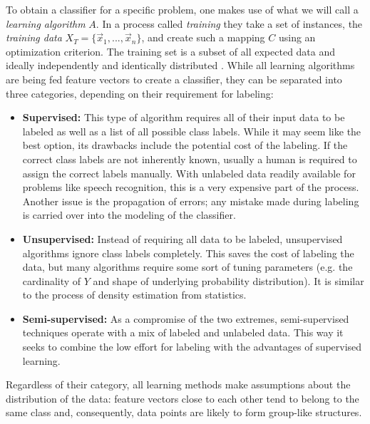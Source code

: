 To obtain a classifier for a specific problem, one makes use of what we will call a \textit{learning algorithm} $A$. In a process called \textit{training} they take a set of instances, the \textit{training data} $X_T = \{\vec{x}_1, ..., \vec{x}_n\}$, and create such a mapping $C$ using an optimization criterion. The training set is a subset of all expected data and ideally independently and identically distributed \cite{RodriguezEtAl2013}. While all learning algorithms are being fed feature vectors to create a classifier, they can be separated into three categories, depending on their requirement for labeling:
\begin{itemize}
\item \textbf{Supervised:}
This type of algorithm requires all of their input data to be labeled as well as a list of all possible class labels. While it may seem like the best option, its drawbacks include the potential cost of the labeling. If the correct class labels are not inherently known, usually a human is required to assign the correct labels manually. With unlabeled data readily available for problems like speech recognition, this is a very expensive part of the process. Another issue is the propagation of errors; any mistake made during labeling is carried over into the modeling of the classifier.

\item \textbf{Unsupervised:}
Instead of requiring all data to be labeled, unsupervised algorithms ignore class labels completely. This saves the cost of labeling the data, but many algorithms require some sort of tuning parameters (e.g. the cardinality of $Y$ and shape of underlying probability distribution). It is similar to the process of density estimation from statistics.

\item \textbf{Semi-supervised:}
As a compromise of the two extremes, semi-supervised techniques operate with a mix of labeled and unlabeled data. This way it seeks to combine the low effort for labeling with the advantages of supervised learning.
\end{itemize}

Regardless of their category, all learning methods make assumptions about the distribution of the data: feature vectors close to each other tend to belong to the same class and, consequently, data points are likely to form group-like structures.


